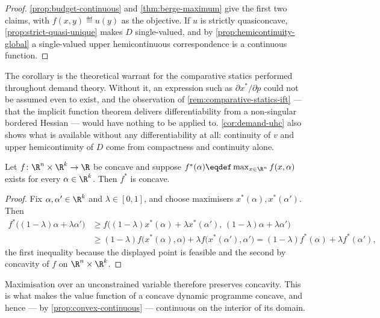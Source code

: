 \begin{proof}
	\autoref{prop:budget-continuous} and \autoref{thm:berge-maximum} give the first
	two claims, with $f(x,y)\eqdef u(y)$ as the objective. If $u$ is strictly
	quasiconcave, \autoref{prop:strict-quasi-unique} makes $D$ single-valued, and by
	\autoref{prop:hemicontinuity-global} a single-valued upper hemicontinuous
	correspondence is a continuous function.
\end{proof}

The corollary is the theoretical warrant for the comparative statics performed
throughout demand theory. Without it, an expression such as
$\partial x^{\ast}/\partial p$ could not be assumed even to exist, and the
observation of \autoref{rem:comparative-statics-ift} --- that the implicit
function theorem delivers differentiability from a non-singular bordered Hessian
--- would have nothing to be applied to. \autoref{cor:demand-uhc} also shows what
is available without any differentiability at all: continuity of $v$ and upper
hemicontinuity of $D$ come from compactness and continuity alone.

\begin{proposition}\label{prop:value-concave}
	Let $f\colon\R^{n}\times\R^{k}\to\R$ be concave and suppose
	$f^{\ast}(\alpha)\eqdef\max_{x\in\R^{n}}f(x,\alpha)$ exists for every
	$\alpha\in\R^{k}$. Then $f^{\ast}$ is concave.
\end{proposition}

\begin{proof}
	Fix $\alpha,\alpha'\in\R^{k}$ and $\lambda\in[0,1]$, and choose maximisers
	$x^{\ast}(\alpha),x^{\ast}(\alpha')$. Then
	\begin{align*}
		f^{\ast}\bigl((1-\lambda)\alpha+\lambda\alpha'\bigr)
		 & \geq f\bigl((1-\lambda)x^{\ast}(\alpha)+\lambda x^{\ast}(\alpha'),\,
		(1-\lambda)\alpha+\lambda\alpha'\bigr)                                  \\
		 & \geq(1-\lambda)f\bigl(x^{\ast}(\alpha),\alpha\bigr)
		+\lambda f\bigl(x^{\ast}(\alpha'),\alpha'\bigr)
		=(1-\lambda)f^{\ast}(\alpha)+\lambda f^{\ast}(\alpha'),
	\end{align*}
	the first inequality because the displayed point is feasible and the second by
	concavity of $f$ on $\R^{n}\times\R^{k}$.
\end{proof}

Maximisation over an unconstrained variable therefore preserves concavity. This
is what makes the value function of a concave dynamic programme concave, and hence
--- by \autoref{prop:convex-continuous} --- continuous on the interior of its
domain.

